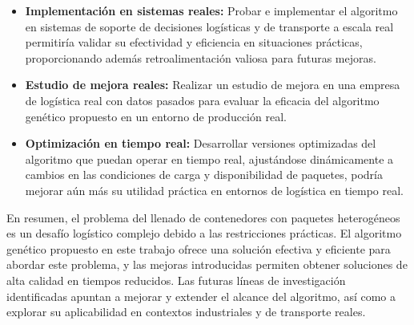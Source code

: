 \documentclass[openany]{article}
\begin{document}
\begin{itemize}
    \item \textbf{Implementación en sistemas reales:} Probar e implementar el algoritmo en sistemas de soporte de decisiones logísticas y de transporte a escala real permitiría validar su efectividad y eficiencia en situaciones prácticas, proporcionando además retroalimentación valiosa para futuras mejoras.
    \item \textbf{Estudio de mejora reales:} Realizar un estudio de mejora en una empresa de logística real con datos pasados para evaluar la eficacia del algoritmo genético propuesto en un entorno de producción real.

    \item \textbf{Optimización en tiempo real:} Desarrollar versiones optimizadas del algoritmo que puedan operar en tiempo real, ajustándose dinámicamente a cambios en las condiciones de carga y disponibilidad de paquetes, podría mejorar aún más su utilidad práctica en entornos de logística en tiempo real.
\end{itemize}

En resumen, el problema del llenado de contenedores con paquetes heterogéneos es un desafío logístico complejo debido a las restricciones prácticas. El algoritmo genético propuesto en este trabajo ofrece una solución efectiva y eficiente para abordar este problema, y las mejoras introducidas permiten obtener soluciones de alta calidad en tiempos reducidos. Las futuras líneas de investigación identificadas apuntan a mejorar y extender el alcance del algoritmo, así como a explorar su aplicabilidad en contextos industriales y de transporte reales.








\newpage


\end{document}
